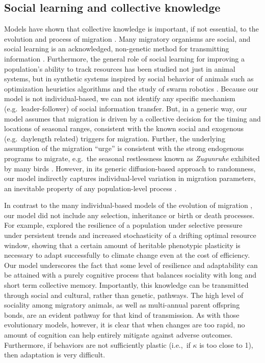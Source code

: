 \documentclass[utf8]{frontiersSCNS} %
\begin{document}
\subsection{Social learning and collective knowledge}	
	
	Models have shown that collective knowledge is important, if not essential, to the evolution and process of migration \citep{Shaw2013, Guttal2010, Berdahl2018}. Many migratory organisms are social, and social learning is an acknowledged, non-genetic method for transmitting information \citep{Kashetsky}. Furthermore, the general role of social learning for improving a population's ability to track resources has been studied not just in animal systems, but in synthetic systems inspired by social behavior of animals such as optimization heuristics algorithms and the study of swarm robotics \citep{Sahin2005, Brambilla2013}.  Because our model is not individual-based, we can not identify any specific mechanism (e.g.~leader-follower) of social information transfer.  But, in a generic way, our model assumes that migration is driven by a collective decision for the timing and locations of seasonal ranges, consistent with the known social and exogenous (e.g.~daylength related) triggers for migration. Further, the underlying assumption of the migration ``urge'' is consistent with the strong endogenous programs to migrate, e.g.~the seasonal restlessness known as \emph{Zugunruhe} exhibited by many birds \citep{Berthold1999, Helm2006}.  However, in its generic diffusion-based approach to randomness, our model indirectly captures individual-level variation in migration parameters, an inevitable property of any population-level process \citep{Gurarie2019}. 
	
	In contrast to the many individual-based models of the evolution of migration \citep[e.g.][]{Guttal2010, Shaw2013, Anderson2013}, our model did not include any selection, inheritance or birth or death processes. For example, \citet{Anderson2013} explored the resilience of a population under selective pressure under persistent trends and increased stochasticity of a drifting optimal resource window, showing that a certain amount of heritable phenotypic plasticity is necessary to adapt successfully to climate change even at the cost of efficiency. Our model underscores the fact that some level of resilience and adaptability can be attained with a purely cognitive process that balances sociality with long and short term collective memory. Importantly, this knowledge can be transmitted through social and cultural, rather than genetic, pathways. The high level of sociality among migratory animals, as well as multi-annual parent offspring bonds, are an evident pathway for that kind of transmission.  As with those evolutionary models, however, it is clear that when changes are too rapid, no amount of cognition can help entirely mitigate against adverse outcomes. Furthermore, if behaviors are not sufficiently plastic (i.e.,~if $\kappa$ is too close to 1), then adaptation is very difficult.  
	
\end{document}
